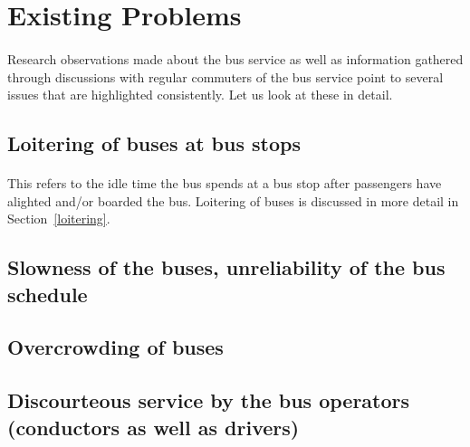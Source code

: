 \section{Existing Problems}
\label{section-ExistingProblems}

\paragraph{} Research observations made about the bus service as well as information gathered through discussions with regular commuters of the bus service point to several issues that are highlighted consistently. Let us look at these in detail.

\subsection{Loitering of buses at bus stops}

\paragraph{} This refers to the idle time the bus spends at a bus stop after passengers have alighted and/or boarded the bus. Loitering of buses is discussed in more detail in Section~\ref{loitering}.

\subsection{Slowness of the buses, unreliability of the bus schedule}

\paragraph{} 

\subsection{Overcrowding of buses}

\paragraph{} 

\subsection{Discourteous service by the bus operators (conductors as well as drivers)}

\paragraph{} 

